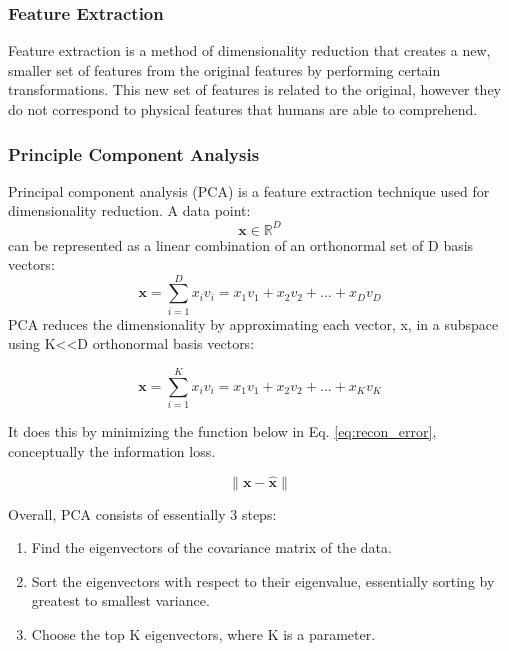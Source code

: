 \documentclass{article}
\begin{document}
\subsubsection*{Feature Extraction}\label{feature-extraction}

Feature extraction is a method of dimensionality reduction that creates 
a new, smaller set of features from the original features by performing 
certain transformations. This new set of features is related to the original, 
however they do not correspond to physical features that humans are able to comprehend. 

\subsubsection*{Principle Component Analysis}\label{principle-component-analysis}

Principal component analysis (PCA) is a feature extraction technique used for dimensionality reduction. 
A data point:
\begin{equation}\label{eq:xRD}
    \mathbf{x} \in \mathbb{R}^D
\end{equation}
can be represented as a linear combination of an orthonormal set of D basis vectors:
\begin{equation}\label{eq:lin_combo_D}
    \mathbf{x} = \sum_{i=1}^{D} x_i v_i = x_1 v_1 + x_2 v_2 + \ldots + x_D v_D
\end{equation}
PCA reduces the dimensionality by approximating each vector, x, in a subspace using K<<D orthonormal
basis vectors:

\begin{equation}\label{eq:lin_combo_K}
    \mathbf{x} = \sum_{i=1}^{K} x_i v_i = x_1 v_1 + x_2 v_2 + \ldots + x_K v_K
\end{equation}

It does this by minimizing the function below in Eq. \ref{eq:recon_error}, conceptually the information loss.

\begin{equation}\label{eq:recon_error}
    \| \mathbf{x} - \hat{\mathbf{x}} \|
\end{equation}

Overall, PCA consists of essentially 3 steps: 

\begin{enumerate}
    \item Find the eigenvectors of the covariance matrix of the data.
    \item Sort the eigenvectors with respect to their eigenvalue, essentially sorting by greatest to smallest variance.
    \item Choose the top K eigenvectors, where K is a parameter.
\end{enumerate}
\end{document}

